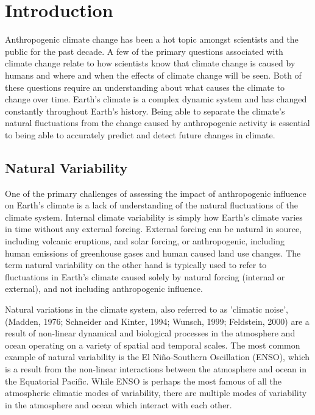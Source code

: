 \graphicspath{{figures/chapter-intro/}} %


\chapter{Introduction}
\label{cha:intro}


Anthropogenic climate change has been a hot topic amongst scientists and the public for the past decade. A few of the primary questions associated with climate change relate to how scientists know that climate change is caused by humans and where and when the effects of climate change will be seen. Both of these questions require an understanding about what causes the climate to change over time. Earth's climate is a complex dynamic system and has changed constantly throughout Earth's history. Being able to separate the climate's natural fluctuations from the change caused by anthropogenic activity is essential to being able to accurately predict and detect future changes in climate.

\section{Natural Variability}

One of the primary challenges of assessing the impact of anthropogenic influence on Earth's climate is a lack of understanding of the natural fluctuations of the climate system. Internal climate variability is simply how Earth's climate varies in time without any external forcing. External forcing can be natural in source, including volcanic eruptions, and solar forcing, or anthropogenic, including human emissions of greenhouse gases and human caused land use changes. The term natural variability on the other hand is typically used to refer to fluctuations in Earth's climate caused solely by natural forcing (internal or external), and not including anthropogenic influence.

Natural variations in the climate system, also referred to as 'climatic noise', (Madden, 1976; Schneider and Kinter, 1994; Wunsch, 1999; Feldstein, 2000) are a result of non-linear dynamical and biological processes in the atmosphere and ocean operating on a variety of spatial and temporal scales. The most common example of natural variability is the El Ni\~no-Southern Oscillation (ENSO), which is a result from the non-linear interactions between the atmosphere and ocean in the Equatorial Pacific. While ENSO is perhaps the most famous of all the atmospheric climatic modes of variability, there are multiple modes of variability in the atmosphere and ocean which interact with each other.

